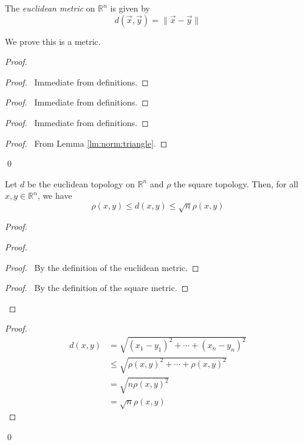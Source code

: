 \begin{df}
  The \emph{euclidean metric} on $\mathbb{R}^n$ is given by
  \[ d(\vec{x}, \vec{y}) = \| \vec{x} - \vec{y} \| \]

  We prove this is a metric.
\end{df}

\begin{proof}
  \pf
  \begin{proof}
    \pf\ Immediate from definitions.
  \end{proof}
  \begin{proof}
    \pf\ Immediate from definitions.
  \end{proof}
  \begin{proof}
    \pf\ Immediate from definitions.
  \end{proof}
  \begin{proof}
    \pf\ From Lemma \ref{lm:norm:triangle}.
  \end{proof}
  \qed
\end{proof}

\begin{lm}
  \label{lm:topology:metric:euclidean_square}
  Let $d$ be the euclidean topology on $\mathbb{R}^n$ and $\rho$ the square
  topology. Then, for all $x, y \in \mathbb{R}^n$, we have
  \[ \rho(x, y) \leq d(x, y) \leq \sqrt{n} \rho(x, y) \]
\end{lm}

\begin{proof}
  \pf
  \begin{proof}
    \begin{proof}
      \pf\ By the definition of the euclidean metric.
    \end{proof}
    \qedstep
    \begin{proof}
      \pf\ By the definition of the square metric.
    \end{proof}
  \end{proof}
  \begin{proof}
    \pf
    \begin{align*}
      d(x, y) & = \sqrt{(x_1 - y_1)^2 + \cdots + (x_n - y_n)^2} \\
      & \leq \sqrt{\rho(x,y)^2 + \cdots + \rho(x, y)^2} \\
      & = \sqrt{n \rho(x,y)^2} \\
      & = \sqrt{n} \rho(x, y)
    \end{align*}
  \end{proof}
  \qed
\end{proof}

